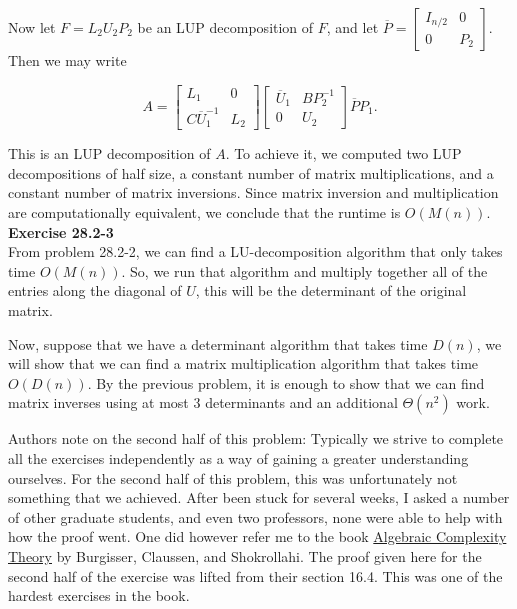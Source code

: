 \documentclass{article}
\begin{document}
Now let $F = L_2U_2P_2$ be an LUP decomposition of $F$, and let $\overline{P} = \left[\begin{array}{cc}I_{n/2} & 0 \\ 0 & P_2 \end{array}\right]$.   Then we may write

\[ A = \left[\begin{array}{cc}L_1 & 0 \\ C\overline{U}_1^{-1} & L_2 \end{array}\right] \left[ \begin{array}{cc} \overline{U}_1 & BP_2^{-1} \\ 0 & U_2 \end{array}\right] \overline{P}P_1. \]

This is an LUP decomposition of $A$.  To achieve it, we computed two LUP decompositions of half size, a constant number of matrix multiplications, and a constant number of matrix inversions.  Since matrix inversion and multiplication are computationally equivalent, we conclude that the runtime is $O(M(n))$. \\ 


\noindent\textbf{Exercise 28.2-3}\\

From problem 28.2-2, we can find a LU-decomposition algorithm that only takes time $O(M(n))$. So, we run that algorithm and multiply together all of the entries along the diagonal of $U$, this will be the determinant of the original matrix.

Now, suppose that we have a determinant algorithm that takes time $D(n)$, we will show that we can find a matrix multiplication algorithm that takes time $O(D(n))$.  By the previous problem, it is enough to show that we can find matrix inverses using at most 3 determinants and an additional $\Theta(n^2)$ work. 

Authors note on the second half of this problem: Typically we strive to complete all the exercises independently as a way of gaining a greater understanding ourselves. For the second half of this problem, this was unfortunately not something that we achieved. After been stuck for several weeks, I asked a number of other graduate students, and even two professors, none were able to help with how the proof went. One did however refer me to the book \underline{Algebraic Complexity Theory} by Burgisser, Claussen, and Shokrollahi. The proof given here for the second half of the exercise was lifted from their section 16.4. This was one of the hardest exercises in the book.
\end{document}

